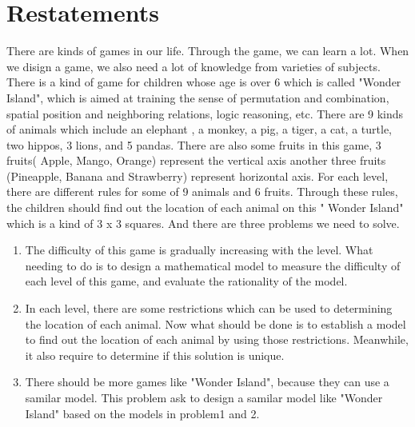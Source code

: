 \documentclass[12pt,a4paper,]{article}
\begin{document}
\newpage

\tableofcontents

\newpage
\renewcommand{\baselinestretch}{1.5}
\section{Restatements}
There are kinds of games in our life. Through the game, we can learn a lot. When we disign a game, we also need a lot of knowledge from varieties of subjects.  There is a kind of game for children whose age is over 6 which is called "Wonder Island", which is aimed at training the sense of permutation and combination, spatial position and neighboring relations, logic reasoning, etc.  There are 9 kinds of animals which include an elephant , a monkey, a pig, a tiger, a cat, a turtle, two hippos, 3 lions, and 5 pandas.  There are also some fruits in this game, 3 fruits( Apple, Mango, Orange)  represent the vertical axis another three fruits (Pineapple, Banana and Strawberry) represent horizontal axis. For each level, there are different rules for some of 9 animals and 6 fruits. Through these rules, the children should find out the location of each animal on this " Wonder Island"  which is a kind of 3 x 3 squares. And there are three problems we need to solve.

\begin{enumerate}[(1)]
\item The difficulty of this game is gradually increasing with the level. What needing to do is to design a mathematical model to measure the difficulty of each level of this game, and evaluate the rationality of the model.

\item In each level, there are some restrictions which can be used to determining the location of each animal. Now what should be done is to establish a model to find out the location of each animal by using those restrictions. Meanwhile, it also require to determine if this solution is unique.

\item There should be more games like "Wonder Island", because they can use a samilar model. This problem ask to design a samilar model like "Wonder Island" based on the models in problem1 and 2.
\end{enumerate}
\end{document}
